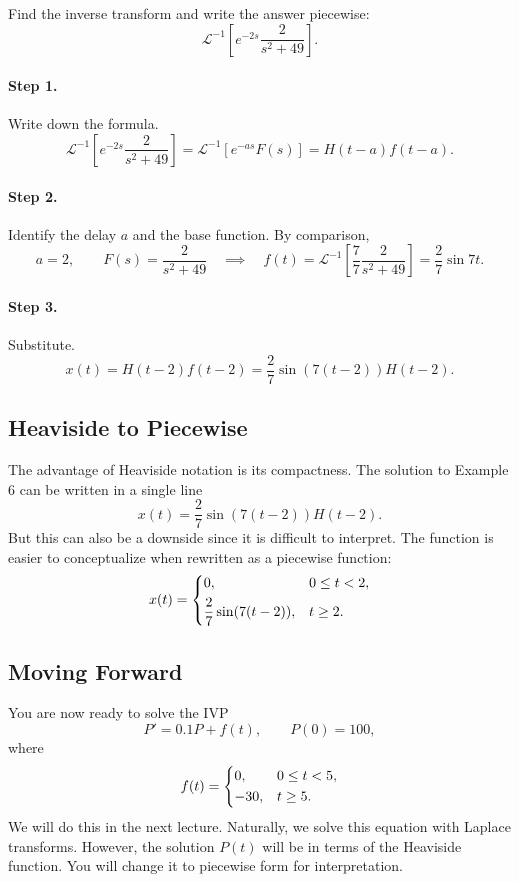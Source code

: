 \documentclass[10pt,letterpaper]{article}
\begin{document}
\begin{example}[6]{
Find the inverse transform and write the answer piecewise:
\[
\mathcal L^{-1}\left[
e^{-2s}\frac{2}{s^2+49}
\right].
\]
}
\paragraph{Step 1.} Write down the formula.
\[
\mathcal L^{-1}\left[
e^{-2s}\frac{2}{s^2+49}
\right]=\mathcal L^{-1}[e^{-as}F(s)]
=H(t-a)f(t-a).
\]
\paragraph{Step 2.} Identify the delay $a$ and the
base function. By comparison,
\[
a=2,\qquad F(s)=\frac{2}{s^2+49}\quad \implies\quad  f(t)=\mathcal L^{-1}\left[\frac{7}{7}\frac{2}{s^2+49}\right]
=\frac{2}{7}\sin7t.
\]
\paragraph{Step 3.} Substitute.
\[
x(t)=H(t-2)f(t-2)
=\boxed{\frac{2}{7}\sin(7(t-2))H(t-2).}
\]
\end{example}

\subsection{Heaviside to Piecewise}
The advantage of Heaviside notation is its compactness. The solution to Example 6 can be written in a single line
$$
    x(t) = \frac{2}{7}\sin(7(t-2))H(t-2).
$$
But this can also be a downside since it is difficult to interpret. The function is easier to conceptualize when rewritten as a piecewise function: 
\[
x(t)=
\begin{dcases}
0, & 0\le t<2,\\
\frac{2}{7}\sin(7(t-2)), & t\ge2.
\end{dcases}
\]

\subsection{Moving Forward}
You are now ready to solve the IVP
\[
P'=0.1P+f(t),\qquad P(0)=100,
\]
where
\[
f(t)=
\begin{dcases}
0, & 0\le t<5,\\
-30, & t\ge5.
\end{dcases}
\]
We will do this in the next lecture. Naturally, we solve this equation with Laplace transforms. However, the solution $P(t)$ will be in terms of the Heaviside function. You will change it to piecewise form for interpretation.
\end{document}
